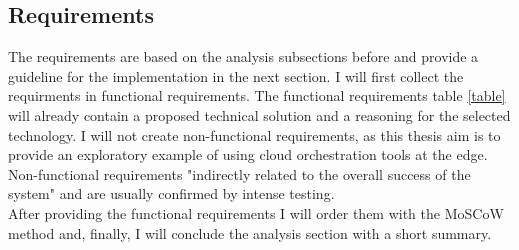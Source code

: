 \subsection{Requirements}
The requirements are based on the analysis subsections before and provide a guideline for the implementation in the next section. I will first collect the requirments in functional requirements. The functional requirements table \cref{table} will already contain a proposed technical solution and a reasoning for the selected technology. I will not create non-functional requirements, as this thesis aim is to provide an exploratory example of using cloud orchestration tools at the edge. Non-functional requirements "indirectly related to the overall success of the system"\cite{aauFunctionalRequirements} and are usually confirmed by intense testing.\\
After providing the functional requirements I will order them with the MoSCoW method\cite{clegg1994caseMoSCoWMethod} and, finally, I will conclude the analysis section with a short summary.

